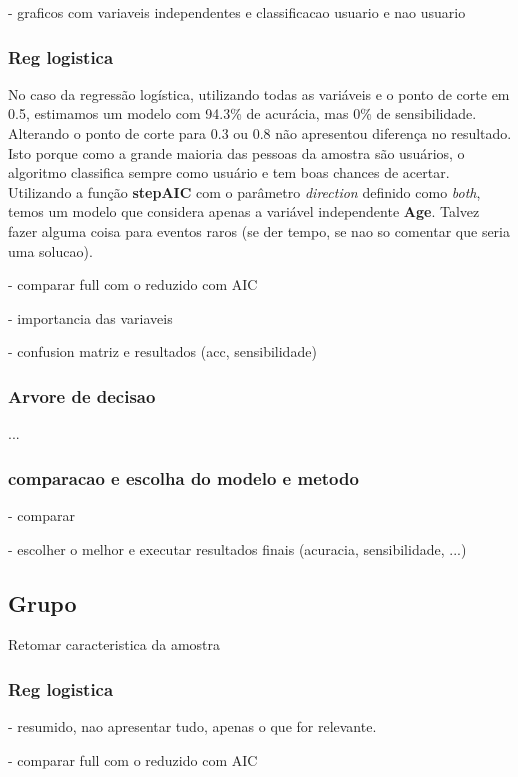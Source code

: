 \documentclass[
	article,			%
	11pt,				%
	oneside,			%
	a4paper,			%
	english,			%
	brazil,				%
	sumario=tradicional
	]{abntex2}
\begin{document}
- graficos com variaveis independentes e classificacao usuario e nao usuario 

\subsubsection{Reg logistica}

No caso da regressão logística, utilizando todas as variáveis e o ponto de corte em 0.5, estimamos um modelo com 94.3\% de acurácia, mas 0\% de sensibilidade. Alterando o ponto de corte para 0.3 ou 0.8 não apresentou diferença no resultado. Isto porque como a grande maioria das pessoas da amostra são usuários, o algoritmo classifica sempre como usuário e tem boas chances de acertar. 
Utilizando a função \textbf{stepAIC} com o parâmetro \emph{direction} definido como \emph{both}, temos um modelo que considera apenas a variável independente \textbf{Age}.
Talvez fazer alguma coisa para eventos raros (se der tempo, se nao so comentar que seria uma solucao).


- comparar full com o reduzido com AIC

- importancia das variaveis

- confusion matriz e resultados (acc, sensibilidade)
\subsubsection{Arvore de decisao}
... 

\subsubsection{comparacao e escolha do modelo e metodo}

- comparar

- escolher o melhor e executar resultados finais (acuracia, sensibilidade, ...)

\subsection{Grupo}

Retomar caracteristica da amostra

\subsubsection{Reg logistica}

- resumido, nao apresentar tudo, apenas o que for relevante.

- comparar full com o reduzido com AIC
\end{document}
